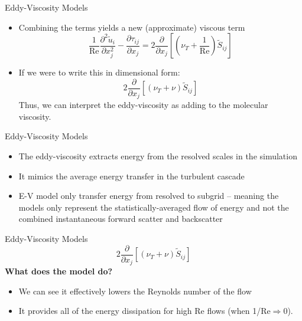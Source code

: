 \begin{frame}{Eddy-Viscosity Models}
\begin{itemize}
\item Combining the terms yields a new (approximate) viscous term
	$$\frac{1}{\text{Re}} \frac{\partial^2 \tilde u_i}{\partial x_j^{2}} -\frac{\partial \tau_{ij}}{\partial x_j} = \boxed{2\frac{\partial}{\partial x_j}\left[\left(\nu_T + \frac{1}{\text{Re}}\right)\widetilde{S}_{ij}\right]}$$
	\item If we were to write this in dimensional form:
	$$\boxed{2\frac{\partial}{\partial x_j}\left[\left(\nu_T + \nu\right)\widetilde{S}_{ij}\right]}$$
	Thus, we can interpret the eddy-viscosity as adding to the molecular viscosity.
\end{itemize}
\end{frame}

\begin{frame}{Eddy-Viscosity Models}
\begin{itemize}
	\item The eddy-viscosity extracts energy from the resolved scales in the simulation
	\item It mimics the average energy transfer in the turbulent cascade
	\item E-V model only transfer energy from resolved to subgrid -- meaning the models only represent the statistically-averaged flow of energy and not the combined instantaneous forward scatter and backscatter
\end{itemize}

\end{frame}

\begin{frame}{Eddy-Viscosity Models}
$$2\frac{\partial}{\partial x_j}\left[\left(\nu_T + \nu\right)\widetilde{S}_{ij}\right]$$
\newline\newline
\textbf{What does the model do?}
\begin{itemize}
	\item We can see it effectively lowers the Reynolds number of the flow
	\item It provides all of the energy dissipation for high Re flows (when 1/Re$\Rightarrow$0).
\end{itemize}
\end{frame}


